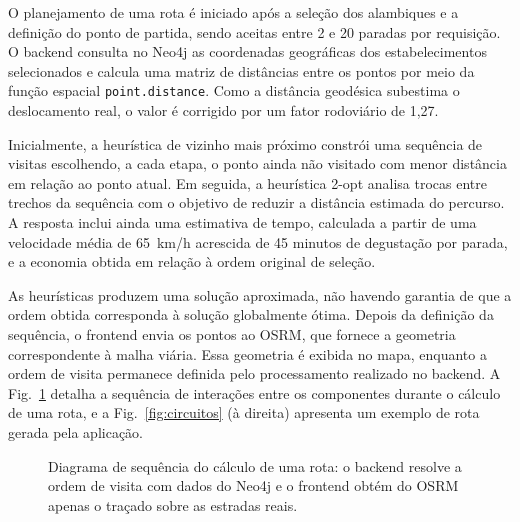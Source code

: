 \documentclass{jaes}
\begin{document}
O planejamento de uma rota é iniciado após a seleção dos alambiques e a definição do ponto de partida, sendo aceitas entre 2 e 20 paradas por requisição. O backend consulta no Neo4j as coordenadas geográficas dos estabelecimentos selecionados e calcula uma matriz de distâncias entre os pontos por meio da função espacial \texttt{point.distance}. Como a distância geodésica subestima o deslocamento real, o valor é corrigido por um fator rodoviário de 1,27.

Inicialmente, a heurística de vizinho mais próximo constrói uma sequência de visitas escolhendo, a cada etapa, o ponto ainda não visitado com menor distância em relação ao ponto atual. Em seguida, a heurística 2-opt analisa trocas entre trechos da sequência com o objetivo de reduzir a distância estimada do percurso. A resposta inclui ainda uma estimativa de tempo, calculada a partir de uma velocidade média de 65~km/h acrescida de 45 minutos de degustação por parada, e a economia obtida em relação à ordem original de seleção.

As heurísticas produzem uma solução aproximada, não havendo garantia de que a ordem obtida corresponda à solução globalmente ótima. Depois da definição da sequência, o frontend envia os pontos ao OSRM, que fornece a geometria correspondente à malha viária. Essa geometria é exibida no mapa, enquanto a ordem de visita permanece definida pelo processamento realizado no backend. A Fig.~\ref{fig:sequencia} detalha a sequência de interações entre os componentes durante o cálculo de uma rota, e a Fig.~\ref{fig:circuitos} (à direita) apresenta um exemplo de rota gerada pela aplicação.

\begin{figure}[t]
\centering
{}
\caption{Diagrama de sequência do cálculo de uma rota: o backend resolve a ordem de visita com dados do Neo4j e o frontend obtém do OSRM apenas o traçado sobre as estradas reais.}
\label{fig:sequencia}
\end{figure}
\end{document}
